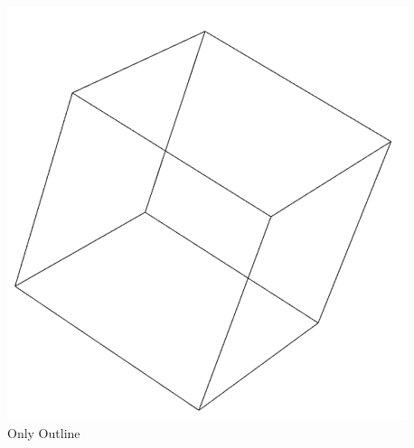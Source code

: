 \documentclass[11pt,a4paper,oneside]{article}
\begin{document}
    \begin{center}
    	\includegraphics[scale=0.5]{2.png} \\
    	Only Outline	
    \end{center}
\end{document}
